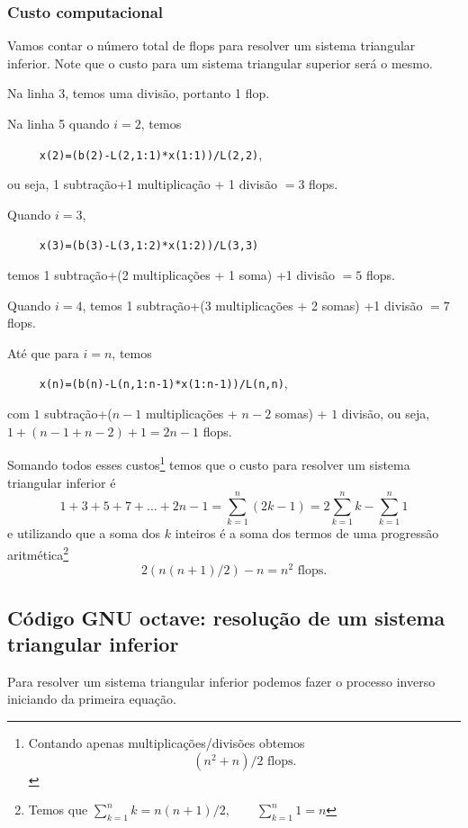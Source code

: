 

\subsubsection{Custo computacional}
Vamos contar o número total de flops para resolver um sistema triangular inferior. Note que o custo para um sistema triangular superior será o mesmo.

Na linha 3, temos uma divisão, portanto 1 flop.

Na linha 5 quando $i=2$, temos

\verb#     x(2)=(b(2)-L(2,1:1)*x(1:1))/L(2,2)#,

ou seja, 1 subtração+1 multiplicação + 1 divisão $=3$ flops.

Quando $i=3$,

\verb#     x(3)=(b(3)-L(3,1:2)*x(1:2))/L(3,3)#

temos 1 subtração+(2 multiplicações + 1 soma) +1 divisão $=5$ flops.

Quando $i=4$, temos 1 subtração+(3 multiplicações + 2 somas) +1 divisão $=7$ flops.

Até que para $i=n$, temos

\verb#     x(n)=(b(n)-L(n,1:n-1)*x(1:n-1))/L(n,n)#,

com $1$ subtração+($n-1$ multiplicações + $n-2$ somas) + $1$ divisão, ou seja, $1+(n-1+n-2)+1=2n-1$ flops.

Somando todos esses custos\footnote{Contando apenas multiplicações/divisões obtemos
\begin{equation}
  (n^2+n)/2  \text{~flops}.
\end{equation}} temos que o custo para resolver um sistema triangular inferior é
\begin{equation}
  1 +3+5+7+...+2n-1=  \sum_{k=1}^n(2k-1) = 2 \sum_{k=1}^nk -\sum_{k=1}^n1
\end{equation}
e utilizando que a soma dos $k$ inteiros é a soma dos termos de uma progressão aritmética\footnote{Temos que $\displaystyle \sum_{k=1}^n k =n(n+1)/2, \quad\quad \sum_{k=1}^n 1=n$}
\begin{equation}
  2 ( n(n+1)/2 ) -n=  n^2 \text{~flops}.
\end{equation}
\fi
\ifisoctave
\subsection{Código GNU octave: resolução de um sistema triangular inferior}
Para resolver um sistema triangular inferior podemos fazer o processo inverso iniciando da primeira equação.

